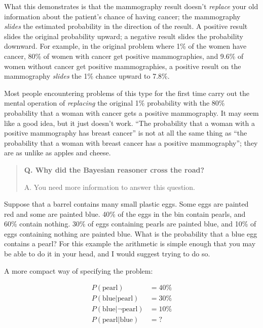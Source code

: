 { What this demonstrates is that the mammography result
doesn't \textit{replace} your old information about the
patient's chance of having cancer; the mammography
\textit{slides} the estimated probability in the direction of the
result. A positive result slides the original probability upward; a
negative result slides the probability downward. For example, in the
original problem where 1\% of the women have cancer, 80\% of women with
cancer get positive mammographies, and 9.6\% of women without cancer
get positive mammographies, a positive result on the mammography
\textit{slides} the 1\% chance upward to 7.8\%.


 Most people encountering problems of this type for the first time
carry out the mental operation of \textit{replacing} the original 1\%
probability with the 80\% probability that a woman with cancer gets a
positive mammography. It may seem like a good idea, but it just
doesn't work. ``The probability that a
woman with a positive mammography has breast cancer''
is not at all the same thing as ``the probability that
a woman with breast cancer has a positive
mammography''; they are as unlike as apples and
cheese.

\hr

\begin{quote}

 \textbf{Q. Why did the Bayesian reasoner cross the road?}

{
  A. You need more information to answer this question.}
\end{quote}

\hr


 Suppose that a barrel contains many small plastic eggs. Some eggs
are painted red and some are painted blue. 40\% of the eggs in the bin
contain pearls, and 60\% contain nothing. 30\% of eggs containing
pearls are painted blue, and 10\% of eggs containing nothing are
painted blue. What is the probability that a blue egg contains a pearl?
For this example the arithmetic is simple enough that you may be able
to do it in your head, and I would suggest trying to do so.


 A more compact way of specifying the problem:

\begin{align*}
 P(\text{pearl}) &= 40\% \\
 P(\text{blue}|\text{pearl}) &= 30\% \\
 P(\text{blue}|\lnot\text{pearl}) &= 10\% \\
 P(\text{pearl}|\text{blue}) &= ?
\end{align*}



}
